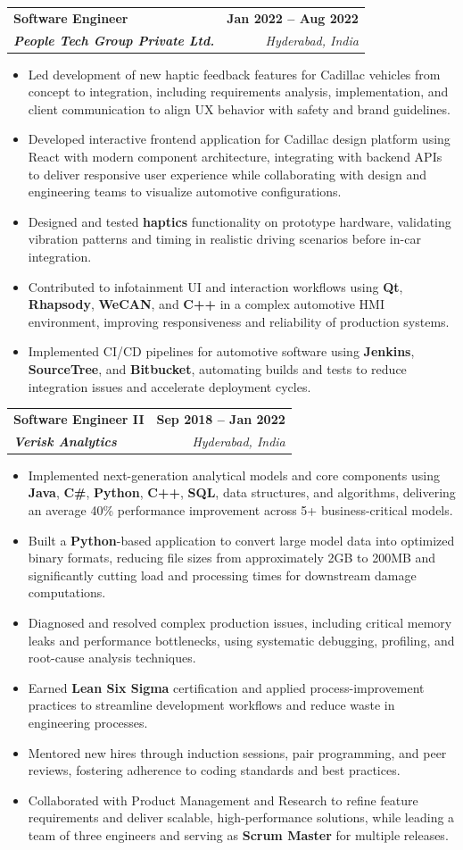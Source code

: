 \documentclass[letterpaper,11pt]{article}
\makeatletter
\newcommand{\resumeItem}[1]{
  \item\small{
    {#1 \vspace{-2pt}}
  }
}
\newcommand{\resumeSubheading}[4]{
  \vspace{-2pt}\item
    \begin{tabular*}{1.0\textwidth}[t]{l@{\extracolsep{\fill}}r}
      \textbf{#1} & \textbf{\small #2} \\
      \textit{\small#3} & \textit{\small #4} \\
    \end{tabular*}\vspace{-7pt}
}
\newcommand{\resumeItemListStart}{\begin{itemize}}
\newcommand{\resumeItemListEnd}{\end{itemize}\vspace{-5pt}}
\makeatother
\begin{document}
    \resumeSubheading
      {\textbf{Software Engineer}}{\textbf{Jan 2022 -- Aug 2022}}
      {\textbf{People Tech Group Private Ltd.}}{Hyderabad, India}
      \resumeItemListStart
        \resumeItem{Led development of new haptic feedback features for Cadillac vehicles from concept to integration, including requirements analysis, implementation, and client communication to align UX behavior with safety and brand guidelines.}
        \resumeItem{Developed interactive frontend application for Cadillac design platform using React with modern component architecture, integrating with backend APIs to deliver responsive user experience while collaborating with design and engineering teams to visualize automotive configurations.}
        \resumeItem{Designed and tested \textbf{haptics} functionality on prototype hardware, validating vibration patterns and timing in realistic driving scenarios before in-car integration.}
        \resumeItem{Contributed to infotainment UI and interaction workflows using \textbf{Qt}, \textbf{Rhapsody}, \textbf{WeCAN}, and \textbf{C++} in a complex automotive HMI environment, improving responsiveness and reliability of production systems.}
        \resumeItem{Implemented CI/CD pipelines for automotive software using \textbf{Jenkins}, \textbf{SourceTree}, and \textbf{Bitbucket}, automating builds and tests to reduce integration issues and accelerate deployment cycles.}
      \resumeItemListEnd

    \resumeSubheading
      {\textbf{Software Engineer II}}{\textbf{Sep 2018 -- Jan 2022}}
      {\textbf{Verisk Analytics}}{Hyderabad, India}
      \resumeItemListStart
        \resumeItem{Implemented next-generation analytical models and core components using \textbf{Java}, \textbf{C\#}, \textbf{Python}, \textbf{C++}, \textbf{SQL}, data structures, and algorithms, delivering an average 40\% performance improvement across 5+ business-critical models.}
        \resumeItem{Built a \textbf{Python}-based application to convert large model data into optimized binary formats, reducing file sizes from approximately 2GB to 200MB and significantly cutting load and processing times for downstream damage computations.}
        \resumeItem{Diagnosed and resolved complex production issues, including critical memory leaks and performance bottlenecks, using systematic debugging, profiling, and root-cause analysis techniques.}
        \resumeItem{Earned \textbf{Lean Six Sigma} certification and applied process-improvement practices to streamline development workflows and reduce waste in engineering processes.}
        \resumeItem{Mentored new hires through induction sessions, pair programming, and peer reviews, fostering adherence to coding standards and best practices.}
        \resumeItem{Collaborated with Product Management and Research to refine feature requirements and deliver scalable, high-performance solutions, while leading a team of three engineers and serving as \textbf{Scrum Master} for multiple releases.}
      \resumeItemListEnd
\end{document}
